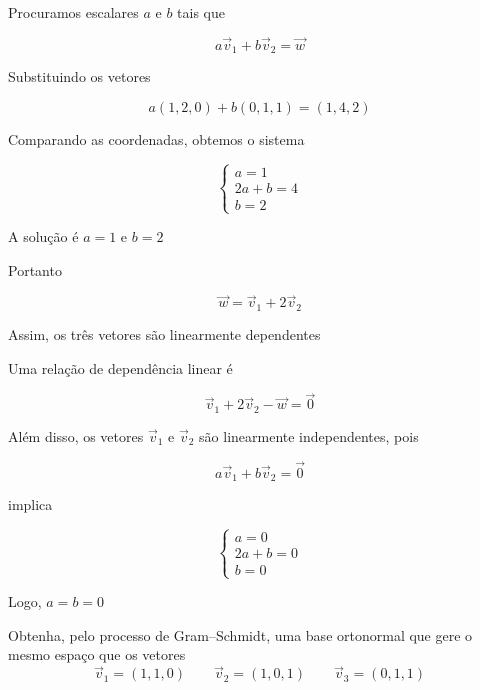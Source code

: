 \documentclass[a4paper,12pt,fleqn]{article}
\begin{document}
\begin{answer}
  Procuramos escalares $a$ e $b$ tais que

  \[
    a\vec{v}_1+b\vec{v}_2=\vec{w}
  \]

  Substituindo os vetores

  \[
    a(1,2,0)+b(0,1,1)=(1,4,2)
  \]

  Comparando as coordenadas, obtemos o sistema

  \[
    \begin{cases}
      a=1\\
      2a+b=4\\
      b=2
    \end{cases}
  \]

  A solução é $a=1$ e $b=2$

  Portanto

  \[
    \vec{w}=\vec{v}_1+2\vec{v}_2
  \]

  Assim, os três vetores são linearmente dependentes

  Uma relação de dependência linear é

  \[
    \vec{v}_1+2\vec{v}_2-\vec{w}=\vec{0}
  \]

  Além disso, os vetores $\vec{v}_1$ e $\vec{v}_2$ são
  linearmente independentes, pois

  \[
    a\vec{v}_1+b\vec{v}_2=\vec{0}
  \]

  implica

  \[
    \begin{cases}
      a=0\\
      2a+b=0\\
      b=0
    \end{cases}
  \]

  Logo, $a=b=0$
\end{answer}

Obtenha, pelo processo de Gram--Schmidt, uma base ortonormal que gere
o mesmo espaço que os vetores
\[
  \vec{v}_1=(1,1,0)
  \qquad
  \vec{v}_2=(1,0,1)
  \qquad
  \vec{v}_3=(0,1,1)
\]
\end{document}

